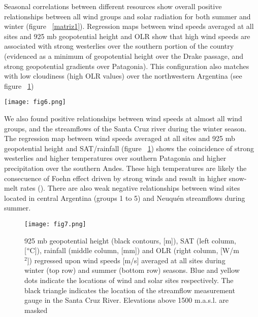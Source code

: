 \documentclass[AMA,Times1COL]{WileyNJDv5} %
\begin{document}
\begin{linenumbers}
Seasonal correlations between different resources show overall positive relationships between all wind groups and solar radiation for both summer and winter (figure ~\ref{matriz1}). Regression maps between wind speeds averaged at all sites and 925 mb geopotential height and OLR show that high wind speeds are associated with strong westerlies over the southern portion of the country (evidenced as a minimum of geopotential height over the Drake passage, and strong geopotential gradients over Patagonia). This configuration also matches with low cloudiness (high OLR values) over the northwestern Argentina (see figure ~\ref{reg1})                                    

\begin{figure*}[hbpt]
	\centering
	\hspace*{-1cm}   
	\texttt{[image: fig6.png]}
	\caption{\label{matriz1} Correlation matrices between seasonally averaged wind speeds, solar radiation, and streamflows. Statistically significant correlations at the 90\% confidence level are indicated by their numerical values.}
\end{figure*}

We also found positive relationships between wind speeds at almost all wind groups, and the streamflows of the Santa Cruz river during the winter season. The regression map between wind speeds averaged at all sites and 925 mb geopotential height and SAT/rainfall (figure ~\ref{reg1}) shows the coincidence of strong westerlies and higher temperatures over southern Patagonia and higher precipitation over the southern Andes. These high temperatures are likely the consecuence of Foehn effect driven by strong winds and result in higher snow-melt rates (\cite{bozkurt2018foehn}). There are also weak negative relationships between wind sites located in central Argentina (groups 1 to 5) and Neuquén streamflows during summer.

\begin{figure}[hbpt]
	\centering
	\hspace*{0cm}   
	\texttt{[image: fig7.png]}
	
	\caption{\label{reg1} 925 mb geopotential  height (black contours, [m]), SAT (left column, [$\degree$C]), rainfall (middle column, [mm]) and OLR (right column, [W/m$^2$]) regressed upon wind speeds [m/s] averaged at all sites during winter (top row) and summer (bottom row) seasons. Blue and yellow dots indicate the locations of wind and solar sites respectively. The black triangle indicates the location of the streamflow measurement gauge in the Santa Cruz River. Elevations above 1500 m.a.s.l. are masked}
		

\end{figure}
\end{linenumbers}
\end{document}

